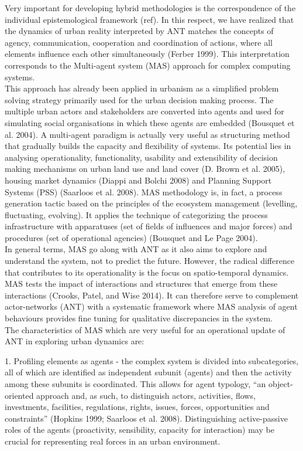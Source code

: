 \documentclass[11pt]{report}
\begin{document}
Very important for developing hybrid methodologies is the correspondence of the individual epistemological framework (ref). In this respect, we have realized that the dynamics of urban reality interpreted by ANT matches the concepts of agency, communication, cooperation and coordination of actions, where all elements influence each other simultaneously (Ferber 1999). This interpretation corresponds to the Multi-agent system (MAS) approach for complex computing systems.
\\
This approach has already been applied in urbanism as a simplified problem solving strategy primarily used for the urban decision making process. The multiple urban actors and stakeholders are converted into agents and used for simulating social organisations in which these agents are embedded (Bousquet et al. 2004). A multi-agent paradigm is actually very useful as structuring method that gradually builds the capacity and flexibility of systems. Its potential lies in analysing  operationality, functionality, usability and extensibility of decision making mechanisms on urban land use and land cover (D. Brown et al. 2005), housing market dynamics (Diappi and Bolchi 2008) and Planning Support Systems (PSS) (Saarloos et al. 2008). MAS methodology is, in fact, a process generation tactic based on the principles of the ecosystem management (levelling, fluctuating, evolving). It applies the technique of categorizing the process infrastructure with apparatuses (set of fields of influences and major forces) and procedures (set of operational agencies) (Bousquet and Le Page 2004).
\\
In general terms, MAS go along with ANT as it also aims to explore and understand the system, not to predict the future. However, the radical difference that contributes to its operationality is the focus on spatio-temporal dynamics. MAS tests the impact of interactions and structures that emerge from these interactions (Crooks, Patel, and Wise 2014). It can therefore serve to complement actor-networks (ANT) with a systematic framework where MAS analysis of agent behaviours provides fine tuning for qualitative discrepancies in the system. 
\\
The characteristics of MAS which are very useful for an operational update of ANT in exploring urban dynamics are:

1.	Profiling elements as agents - the complex system is divided into subcategories, all of which are identified as independent subunit (agents) and then the activity among these subunits is coordinated. This allows for agent typology, “an object-oriented approach and, as such, to distinguish actors, activities, ﬂows, investments, facilities, regulations, rights, issues, forces, opportunities and constraints” (Hopkins 1999; Saarloos et al. 2008). Distinguishing active-passive roles of the agents (proactivity, sensibility, capacity for interaction) may be crucial for representing real forces in an urban environment.
 
\end{document}
